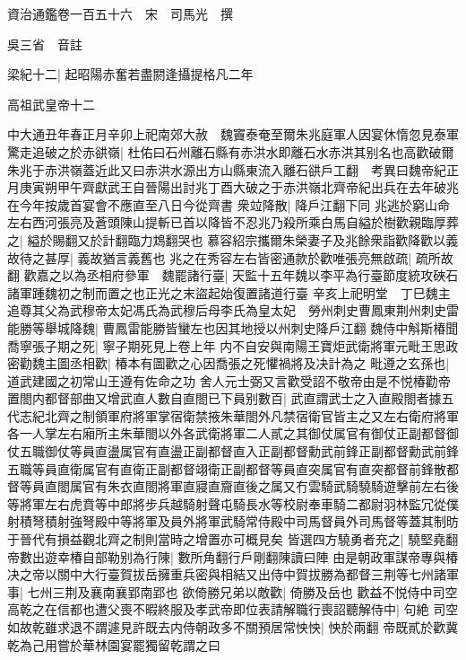資治通鑑卷一百五十六　宋　司馬光　撰

吳三省　音註

梁紀十二|{
	起昭陽赤奮若盡閼逢攝提格凡二年}


高祖武皇帝十二

中大通丑年春正月辛卯上祀南郊大赦　魏竇泰奄至爾朱兆庭軍人因宴休惰忽見泰軍驚走追破之於赤谼嶺|{
	杜佑曰石州離石縣有赤洪水即離石水赤洪其别名也高歡破爾朱兆于赤洪嶺蓋近此又曰赤洪水源出方山縣東流入離石谼戶工翻　考異曰魏帝紀正月庚寅朔甲午齊獻武王自晉陽出討兆丁酉大破之于赤洪嶺北齊帝紀出兵在去年破兆在今年按歲首宴會不應直至八日今從齊書}
衆竝降散|{
	降戶江翻下同}
兆逃於窮山命左右西河張亮及蒼頭陳山提斬已首以降皆不忍兆乃殺所乘白馬自縊於樹歡親臨厚葬之|{
	縊於賜翻又於計翻臨力鴆翻哭也}
慕容紹宗攜爾朱榮妻子及兆餘衆詣歡降歡以義故待之甚厚|{
	義故猶言義舊也}
兆之在秀容左右皆密通款於歡唯張亮無啟疏|{
	疏所故翻}
歡嘉之以為丞相府參軍　魏罷諸行臺|{
	天監十五年魏以李平為行臺節度統攻硤石諸軍踵魏初之制而置之也正光之末盜起始復置諸道行臺}
辛亥上祀明堂　丁巳魏主追尊其父為武穆帝太妃馮氏為武穆后母李氏為皇太妃　勞州刺史曹鳳東荆州刺史雷能勝等舉城降魏|{
	曹鳳雷能勝皆蠻左也因其地授以州刺史降戶江翻}
魏侍中斛斯椿聞喬寧張子期之死|{
	寧子期死見上卷上年}
内不自安與南陽王寶炬武衛將軍元毗王思政密勸魏主圖丞相歡|{
	椿本有圖歡之心因喬張之死懼禍將及决計為之}
毗遵之玄孫也|{
	道武建國之初常山王遵有佐命之功}
舍人元士弼又言歡受詔不敬帝由是不悦椿勸帝置閤内都督部曲又增武直人數自直閤已下員别數百|{
	武直謂武士之入直殿閤者據五代志紀北齊之制領軍府將軍掌宿衛禁掖朱華閤外凡禁宿衛官皆主之又左右衛府將軍各一人掌左右廂所主朱華閤以外各武衛將軍二人貳之其御仗属官有御仗正副都督御仗五職御仗等員直盪属官有直盪正副都督直入正副都督勳武前鋒正副都督勳武前鋒五職等員直衛属官有直衛正副都督翊衛正副都督等員直突属官有直突都督前鋒散都督等員直閤属官有朱衣直閤將軍直寢直齎直後之属又冇雲騎武騎驍騎遊擊前左右後等將軍左右虎賁等中郎將步兵越騎射聲屯騎長水等校尉奉車騎二都尉羽林監冗從僕射積弩積射強弩殿中等將軍及員外將軍武騎常侍殿中司馬督員外司馬督等蓋其制昉于晉代有損益觀北齊之制則當時之增置亦可概見矣}
皆選四方驍勇者充之|{
	驍堅堯翻}
帝數出遊幸椿自部勒别為行陳|{
	數所角翻行戶剛翻陳讀曰陣}
由是朝政軍謀帝專與椿决之帝以關中大行臺賀拔岳擁重兵密與相結又出侍中賀拔勝為都督三荆等七州諸軍事|{
	七州三荆及襄南襄郢南郢也}
欲倚勝兄弟以敵歡|{
	倚勝及岳也}
歡益不悦侍中司空高乾之在信都也遭父喪不暇終服及孝武帝即位表請解職行喪詔聽解侍中|{
	句絶}
司空如故乾雖求退不謂遽見許既去内侍朝政多不關預居常怏怏|{
	怏於兩翻}
帝既貳於歡冀乾為己用嘗於華林園宴罷獨留乾謂之曰

